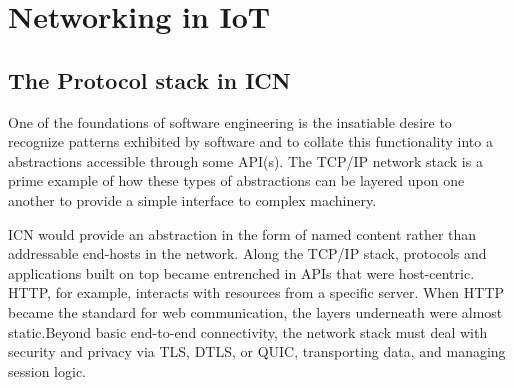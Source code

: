 \section{Networking in IoT}
\label{sec:domain-survey}


\subsection{The Protocol stack in ICN}
One of the foundations of software engineering is the insatiable desire to recognize patterns exhibited by software and to collate this functionality into a abstractions accessible through some API(s). The TCP/IP network stack is a prime example of how these types of abstractions can be layered upon one another to provide a simple interface to complex machinery.\par
ICN would provide an abstraction in the form of named content rather than addressable end-hosts in the network. 
Along the TCP/IP stack, protocols and applications built on top became entrenched in APIs that were host-centric. HTTP, for example, interacts with resources from a specific server. When HTTP became the standard for web communication, the layers underneath were almost static.Beyond basic end-to-end connectivity, the network stack must deal with security and privacy via TLS, DTLS, or QUIC, transporting data, and managing session logic. 


